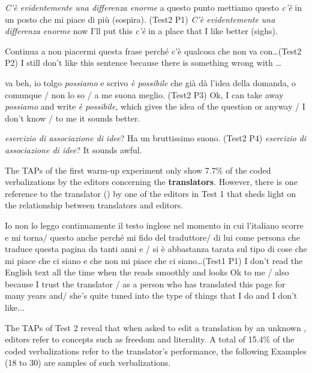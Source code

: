 \documentclass[output=paper]{LSP/langsci}
\begin{document}
\ea \label{troqe-marchan:ex:13} 
\glt \textit{C'è evidentemente una differenza enorme} a questo punto mettiamo questo \textit{c'è} in un posto che mi piace di più (sospira).  (Test2 P1)
\glt \textit{C'è evidentemente una differenza enorme} now I'll put this \textit{c'è} in a place that I like better (sighs).
\z 

\ea \label{troqe-marchan:ex:14} 
\glt Continua a non piacermi questa frase perché c'è qualcosa che non va con\ldots  (Test2 P2)
\glt I still don't like this sentence because there is something wrong with \ldots
\z

\ea \label{troqe-marchan:ex:15} 
\glt va beh, io tolgo \textit{possiamo} e scrivo \textit{è possibile} che già dà l'idea della domanda, o comunque / non lo so / a me suona meglio. (Test2 P3)
\glt Ok, I can take away \textit{possiamo} and write \textit{è possibile}, which gives the idea of the question or anyway / I don't know / to me it sounds better.
\z 

\ea \label{troqe-marchan:ex:16} 
\glt \textit{esercizio di associazione di idee}? Ha un bruttissimo suono. (Test2 P4)
\glt \textit{esercizio di associazione di idee}? It sounds awful.
\z 

The TAPs of the first warm-up experiment only show 7.7\% of the coded verbalizations by the editors concerning the \textbf{translators}. However, there is one reference to the translator () by one of the editors in Test 1 that sheds light on the relationship between translators and editors. 

\ea \label{troqe-marchan:ex:17} 
\glt Io non lo leggo continuamente il testo inglese nel momento in cui l'italiano scorre e mi torna/ questo anche perché mi fido del traduttore/ di lui come persona che traduce questa pagina da tanti anni e / si è abbastanza tarata sul tipo di cose che mi piace che ci siano e che non mi piace che ci siano\ldots (Test1 P1)
\glt I don't read the English text all the time when the  reads smoothly and looks Ok to me / also because I trust the translator / as a person who has translated this page for many years and/ she's quite tuned into the type of things that I do and I don't like...
\z 

The TAPs of Test 2 reveal that when asked to edit a translation by an unknown , editors refer to concepts such as freedom and literality. A total of 15.4\% of the coded verbalizations refer to the translator's performance, the following Examples (18 to 30) are samples of such verbalizations.
\end{document}
